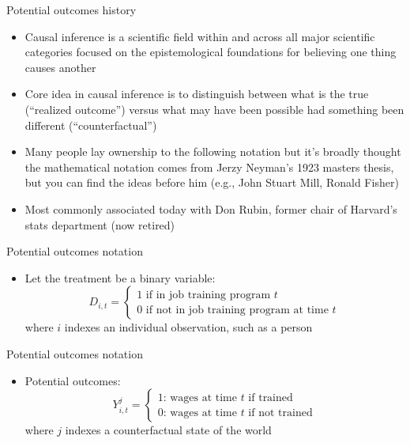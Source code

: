 \documentclass{beamer}
\begin{document}
\begin{frame}{Potential outcomes history}

\begin{itemize}

\item Causal inference is a scientific field within and across all major scientific categories focused on the epistemological foundations for believing one thing causes another
\item Core idea in causal inference is to distinguish between what is the true (``realized outcome'') versus what may have been possible had something been different (``counterfactual'')
\item Many people lay ownership to the following notation but it's broadly thought the mathematical notation comes from Jerzy Neyman's 1923 masters thesis, but you can find the ideas before him (e.g., John Stuart Mill, Ronald Fisher)
\item Most commonly associated today with Don Rubin, former chair of Harvard's stats department (now retired)

\end{itemize}

\end{frame}




\begin{frame}{Potential outcomes notation}
	
	\begin{itemize}
	\item Let the treatment be a binary variable: $$D_{i,t} =\begin{cases} 1 \text{ if in job training program $t$} \\ 0 \text{ if not in job training program at time $t$} \end{cases}$$where $i$ indexes an individual observation, such as a person

	\end{itemize}
\end{frame}

\begin{frame}{Potential outcomes notation}
	
	\begin{itemize}

	\item Potential outcomes: $$Y_{i,t}^j =\begin{cases} 1 \text{: wages at time $t$ if trained} \\ 0 \text{: wages at time $t$ if not trained} \end{cases}$$where $j$ indexes a counterfactual state of the world

	\end{itemize}
\end{frame}
\end{document}
